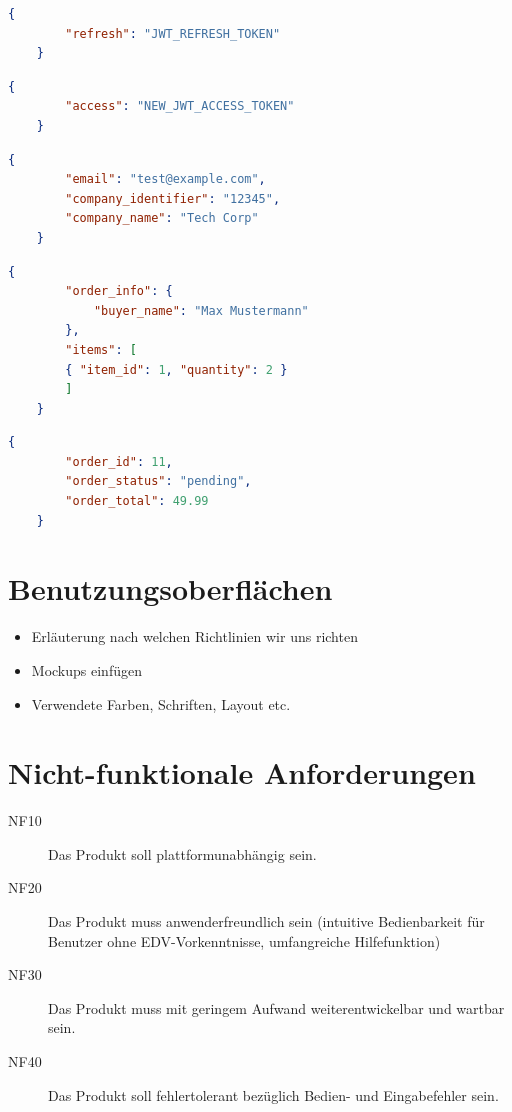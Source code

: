\documentclass[%
	12pt,
	a4paper,
	oneside,
	parskip=full
]{scrbook}
\begin{document}
\begin{lstlisting}[language=json, caption={Request für Token Refresh}, label=lst:refresh-request]
	{
		"refresh": "JWT_REFRESH_TOKEN"
	}
\end{lstlisting}

\begin{lstlisting}[language=json, caption={Response für Token Refresh}, label=lst:refresh-response]
	{
		"access": "NEW_JWT_ACCESS_TOKEN"
	}
\end{lstlisting}

\begin{lstlisting}[language=json, caption={Response für Profilabruf}, label=lst:profile-response]
	{
		"email": "test@example.com",
		"company_identifier": "12345",
		"company_name": "Tech Corp"
	}
\end{lstlisting}

\begin{lstlisting}[language=json, caption={Request für Bestellungen}, label=lst:order-request]
	{
		"order_info": {
			"buyer_name": "Max Mustermann"
		},
		"items": [
		{ "item_id": 1, "quantity": 2 }
		]
	}
\end{lstlisting}

\begin{lstlisting}[language=json, caption={Response für Bestellungen}, label=lst:order-response]
	{
		"order_id": 11,
		"order_status": "pending",
		"order_total": 49.99
	}
\end{lstlisting}

\chapter{Benutzungsoberflächen}
\begin{itemize}
	\item Erläuterung nach welchen Richtlinien wir uns richten
	\item Mockups einfügen
	\item Verwendete Farben, Schriften, Layout etc.
\end{itemize}

\chapter{Nicht-funktionale Anforderungen}
\begin{description}
	\item[NF10] Das Produkt soll plattformunabhängig sein.
	\item[NF20] Das Produkt muss anwenderfreundlich sein (intuitive Bedienbarkeit für Benutzer ohne EDV-Vorkenntnisse, umfangreiche Hilfefunktion)
	\item[NF30] Das Produkt muss mit geringem Aufwand weiterentwickelbar und wartbar sein.
	\item[NF40] Das Produkt soll fehlertolerant bezüglich Bedien- und Eingabefehler sein.
\end{description}
\end{document}
